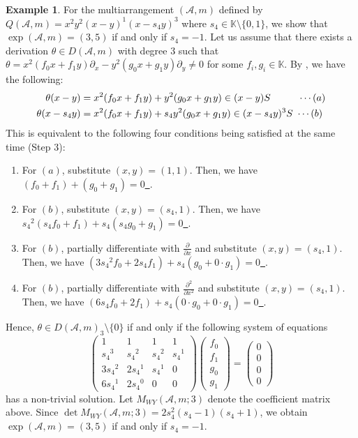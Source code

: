 \documentclass[12pt]{amsart}
\theoremstyle{definition}
\newtheorem{example}[definition]{Example}
\newcommand{\KK}{\mathbb{K}}
\newcommand{\AAA}{\mathcal{A}}
\newcommand{\vecxxxx}[4]{\begin{pmatrix}#1\\#2\\#3\\#4\end{pmatrix}}
\begin{document}
\begin{example}\label{example:M_WY:2213}
    For the multiarrangement $(\AAA,m)$ defined by 
    $Q(\AAA,m)=x^2y^2(x-y)^1(x-{s_4} y)^3$ where $s_4\in\KK\setminus\{0,1\}$, 
    we show that $\exp(\AAA,m)=(3,5)$ if and only if $s_4=-1$. 
    Let us assume that there exists a derivation $\theta\in D(\AAA,m)$ with degree $3$ 
    such that 
    $\theta
    =x^2(f_0x+f_1y) \partial_x - y^2(g_0x+g_1y) \partial_y
    \neq0$ for some $f_i,g_i\in\KK$. 
    By , we have the following: 
    \begin{align*}
    \theta(x-y)&=x^2(f_0x+f_1y) + y^2(g_0x+g_1y)\in(x-y)S \hspace{9.9mm}\cdots (a)\\ 
    \theta(x-{s_4} y)&=x^2(f_0x+f_1y) + {s_4} y^2(g_0x+g_1y)\in(x-{s_4} y)^3S\ \cdots (b)
    \end{align*}
    This is equivalent to the following four conditions 
    being satisfied at the same time (Step 3): 
    \begin{enumerate}
    \item[($a$\ -\ i)] For $(a)$, substitute 
    $(x,y)=(1,1)$. Then, we have \underline{$(f_0+f_1) + (g_0+g_1)=0$\ }. 
    \item[($b$\ -\ i)] For $(b)$, substitute $(x,y)=({s_4},1)$. 
    Then, we have \underline{${s_4}^2({s_4} f_0+f_1) + {s_4}({s_4} g_0+g_1)=0$\ }. 
    \item[($b$\ -ii)] For $(b)$, 
    partially differentiate with $\frac{\partial}{\partial x}$ %
    and substitute $(x,y)=({s_4},1)$. 
    Then, we have 
    \underline{$(3{s_4}^2 f_0+2{s_4} f_1) + {s_4} (g_0+0\cdot g_1)=0$\ }. 
    \item[($b$-iii)] For $(b)$, 
    partially differentiate with $\frac{\partial^2}{\partial x^2}$ %
    and substitute $(x,y)=({s_4},1)$. 
    Then, we have 
    \underline{$(6{s_4} f_0+2f_1) + {s_4} (0\cdot g_0+0\cdot g_1)=0$\ }. 
    \end{enumerate}
    
    Hence, $\theta\in D(\AAA,m)_3\setminus\{0\}$ 
    if and only if the following system of equations 
    \[
    \left(
    \begin{array}{cc|cc}
     1 & 1 & 1 & 1 \\
     \hline
     {s_4}^3 & {s_4}^2 & {s_4}^2 & {s_4}^1 \\
     3{s_4}^2 & 2{s_4}^1 & {s_4}^1 & 0 \\
     6{s_4}^1 & 2{s_4}^0 & 0 & 0 
    \end{array}
    \right)
    \vecxxxx{f_0}{f_1}{g_0}{g_1}
    =
    \vecxxxx{0}{0}{0}{0}
    \]
    has a non-trivial solution. Let $M_{WY}(\AAA,m;3)$ denote the coefficient matrix above. Since 
    $\det M_{WY}(\AAA,m;3)=2s_4^2(s_4-1)(s_4+1)$, 
    we obtain $\exp(\AAA,m)=(3,5)$ if and only if $s_4=-1$.
\end{example}
\end{document}
